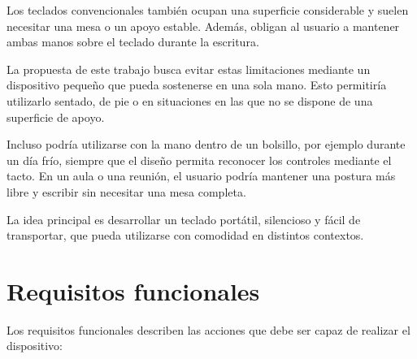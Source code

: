Los teclados convencionales también ocupan una superficie considerable y suelen necesitar una mesa o un apoyo estable. Además, obligan al usuario a mantener ambas manos sobre el teclado durante la escritura.

La propuesta de este trabajo busca evitar estas limitaciones mediante un dispositivo pequeño que pueda sostenerse en una sola mano. Esto permitiría utilizarlo sentado, de pie o en situaciones en las que no se dispone de una superficie de apoyo.

Incluso podría utilizarse con la mano dentro de un bolsillo, por ejemplo durante un día frío, siempre que el diseño permita reconocer los controles mediante el tacto. En un aula o una reunión, el usuario podría mantener una postura más libre y escribir sin necesitar una mesa completa.

La idea principal es desarrollar un teclado portátil, silencioso y fácil de transportar, que pueda utilizarse con comodidad en distintos contextos.

\section{Requisitos funcionales}
\label{sec:requisitos-funcionales}

Los requisitos funcionales describen las acciones que debe ser capaz de realizar el dispositivo:

